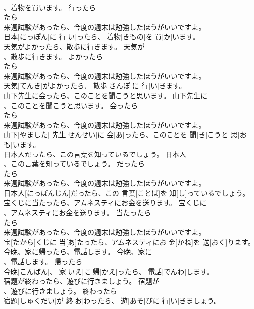 \documentclass[8pt]{extreport}
\begin{document}
\begin{CJK}{UTF8}{min}
\\	、着物を買います。	行ったら	
\\	たら
\\	来週試験があったら、今度の週末は勉強したほうがいいですよ。
\\	日本[にっぽん]に 行[い]ったら、 着物[きもの]を 買[か]います。	
\\	天気がよかったら、散歩に行きます。	天気が
\\	、散歩に行きます。	よかったら	
\\	たら
\\	来週試験があったら、今度の週末は勉強したほうがいいですよ。
\\	天気[てんき]がよかったら、 散歩[さんぽ]に 行[い]きます。	
\\	山下先生に会ったら、このことを聞こうと思います。	山下先生に
\\	、このことを聞こうと思います。	会ったら	
\\	たら
\\	来週試験があったら、今度の週末は勉強したほうがいいですよ。
\\	山下[やました] 先生[せんせい]に 会[あ]ったら、このことを 聞[き]こうと 思[おも]います。	
\\	日本人だったら、この言葉を知っているでしょう。	日本人
\\	、この言葉を知っているでしょう。	だったら	
\\	たら
\\	来週試験があったら、今度の週末は勉強したほうがいいですよ。
\\	日本人[にっぽんじん]だったら、この 言葉[ことば]を 知[し]っているでしょう。	
\\	宝くじに当たったら、アムネスティにお金を送ります。	宝くじに
\\	、アムネスティにお金を送ります。	当たったら	
\\	たら
\\	来週試験があったら、今度の週末は勉強したほうがいいですよ。
\\	宝[たから]くじに 当[あ]たったら、アムネスティにお 金[かね]を 送[おく]ります。	
\\	今晩、家に帰ったら、電話します。	今晩、家に
\\	、電話します。	帰ったら	
\\	今晩[こんばん]、 家[いえ]に 帰[かえ]ったら、 電話[でんわ]します。	
\\	宿題が終わったら、遊びに行きましょう。	宿題が
\\	、遊びに行きましょう。	終わったら	
\\	宿題[しゅくだい]が 終[お]わったら、 遊[あそ]びに 行[い]きましょう。	

\end{CJK}
\end{document}
